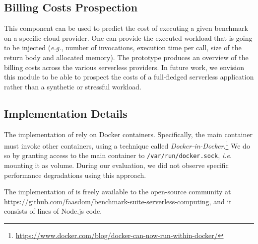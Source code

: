 \subsection{Billing Costs Prospection}
This component can be used to predict the cost of executing a given benchmark on a specific cloud provider.
One can provide the executed workload that is going to be injected (\emph{e.g.}, number of invocations, execution time per call, size of the return body and allocated memory).
The \sys prototype produces an overview of the billing costs across the various serverless providers.
In future work, we envision this module to be able to prospect the costs of a full-fledged serverless application rather than a synthetic or stressful workload.

\subsection{Implementation Details}\label{ssec:impl}
The implementation of \sys rely on Docker containers.
Specifically, the main container must invoke other containers, using a technique called \emph{Docker-in-Docker}.\footnote{\url{https://www.docker.com/blog/docker-can-now-run-within-docker/}}
We do so by granting access to the main container to \texttt{/var/run/docker.sock}, \emph{i.e.} mounting it as volume.
During our evaluation, we did not observe specific performance degradations using this approach.

The implementation of \sys is freely available to the open-source community at \url{https://github.com/faasdom/benchmark-suite-serverless-computing}, and it consists of  lines of Node.js code.